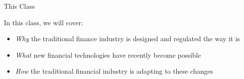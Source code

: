 \documentclass[aspectratio=169]{beamer}
\begin{document}
\begin{frame}{This Class}

In this class, we will cover: 

\begin{itemize}
    \item \emph{Why} the traditional finance industry is designed and regulated the way it is 
    \item \emph{What} new financial technologies have recently become possible 
    \item \emph{How} the traditional financial industry is adapting to these changes 
\end{itemize}

    
\end{frame}
\end{document}
